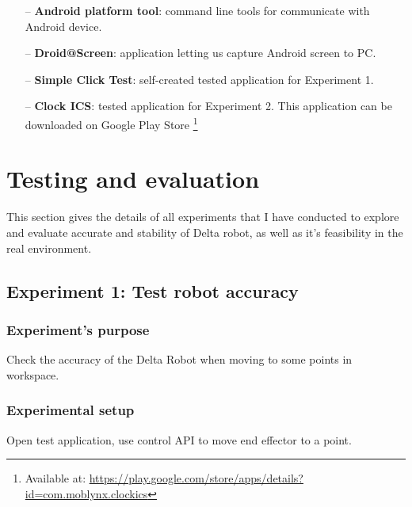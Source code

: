 	\begin{itemize}
		\item[--] \textbf{Android platform tool}: command line tools for communicate with Android device.
		\item[--] \textbf{Droid@Screen}: application letting us capture Android screen to PC.
		\item[--] \textbf{Simple Click Test}: self-created tested application for Experiment 1.
		\item[--] \textbf{Clock ICS}: tested application for Experiment 2. This application can be downloaded on Google Play Store \footnote{Available at: \url{https://play.google.com/store/apps/details?id=com.moblynx.clockics}}
	\end{itemize}

\section{Testing and evaluation}

This section gives the details of all experiments that I have conducted to explore and evaluate accurate and stability of Delta robot, as well as it's feasibility in the real environment.

\subsection{Experiment 1: Test robot accuracy}
\subsubsection{Experiment's purpose}
Check the accuracy of the Delta Robot when moving to some points in workspace.
\subsubsection{Experimental setup}
Open test application, use control API to move end effector to a point.

